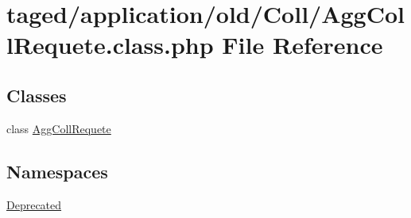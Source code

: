 \hypertarget{_agg_coll_requete_8class_8php}{}\section{taged/application/old/\+Coll/\+Agg\+Coll\+Requete.class.\+php File Reference}
\label{_agg_coll_requete_8class_8php}
\subsection*{Classes}
\begin{DoxyCompactItemize}
\item 
class \hyperlink{class_agg_coll_requete}{Agg\+Coll\+Requete}
\end{DoxyCompactItemize}
\subsection*{Namespaces}
\begin{DoxyCompactItemize}
\item 
 \hyperlink{namespace_deprecated}{Deprecated}
\end{DoxyCompactItemize}
